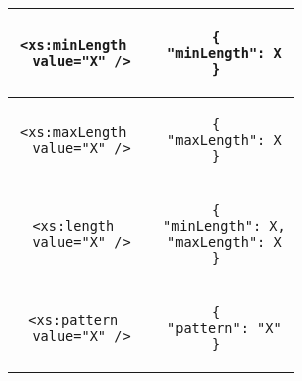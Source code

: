 \begin{longtable}{c|c}
\hline
\begin{minipage}{.4\textwidth}
  \begin{lstlisting}
<xs:minLength
  value="X" />
  \end{lstlisting}
\end{minipage} &
\begin{minipage}{.55\textwidth}
\begin{lstlisting}
{
  "minLength": X
}
\end{lstlisting}
\end{minipage}\\

\hline
\begin{minipage}{.4\textwidth}
  \begin{lstlisting}
<xs:maxLength
  value="X" />
  \end{lstlisting}
\end{minipage} &
\begin{minipage}{.55\textwidth}
\begin{lstlisting}
{
  "maxLength": X
}
\end{lstlisting}
\end{minipage}\\

\hline
\begin{minipage}{.4\textwidth}
  \begin{lstlisting}
<xs:length
  value="X" />
  \end{lstlisting}
\end{minipage} &
\begin{minipage}{.55\textwidth}
\begin{lstlisting}
{
  "minLength": X,
  "maxLength": X
}
\end{lstlisting}
\end{minipage}\\

\hline
\begin{minipage}{.4\textwidth}
  \begin{lstlisting}
<xs:pattern
  value="X" />
  \end{lstlisting}
\end{minipage} &
\begin{minipage}{.55\textwidth}
\begin{lstlisting}
{
  "pattern": "X"
}
\end{lstlisting}
\end{minipage}\\

\end{longtable}
\lstset{
  showstringspaces=false,
  frame=single,
  numbers=left,
  basicstyle=\ttfamily,
  numberstyle=\tiny
}